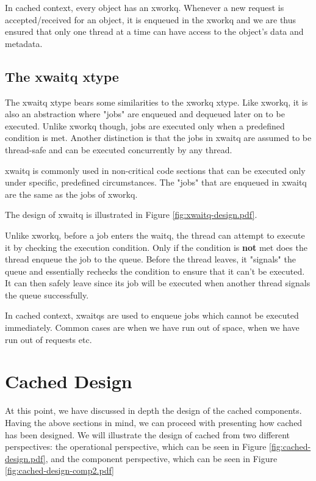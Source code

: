 In cached context, every object has an xworkq. Whenever a new request is 
accepted/received for an object, it is enqueued in the xworkq and we are thus 
ensured that only one thread at a time can have access to the object's data and 
metadata.

\subsection{The xwaitq xtype}\label{sec:xwaitq-design}

The xwaitq xtype bears some similarities to the xworkq xtype. Like xworkq, it 
is also an abstraction where "jobs" are enqueued and dequeued later on to be 
executed. Unlike xworkq though, jobs are executed only when a predefined 
condition is met. Another distinction is that the jobs in xwaitq are assumed to 
be thread-safe and can be executed concurrently by any thread.  

xwaitq is commonly used in non-critical code sections that can be executed only 
under specific, predefined circumstances. The "jobs" that are enqueued in 
xwaitq are the same as the jobs of xworkq.

The design of xwaitq is illustrated in Figure \ref{fig:xwaitq-design.pdf}.


Unlike xworkq, before a job enters the waitq, the thread can attempt to execute 
it by checking the execution condition. Only if the condition is \textbf{not} 
met does the thread enqueue the job to the queue. Before the thread leaves, it 
"signals" the queue and essentially rechecks the condition to ensure that it 
can't be executed. It can then safely leave since its job will be executed when 
another thread signals the queue successfully.

In cached context, xwaitqs are used to enqueue jobs which cannot be executed 
immediately. Common cases are when we have run out of space, when we have run 
out of requests etc.

\section{Cached Design}\label{sec:cached-design}

At this point, we have discussed in depth the design of the cached components.  
Having the above sections in mind, we can proceed with presenting how cached 
has been designed. We will illustrate the design of cached from two different 
perspectives: the operational perspective, which can be seen in Figure 
\ref{fig:cached-design.pdf}, and the component perspective, which can be seen 
in Figure \ref{fig:cached-design-comp2.pdf}

